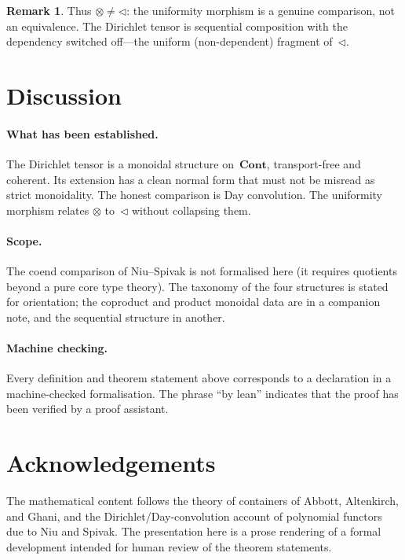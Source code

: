 \documentclass[11pt,a4paper]{article}
\theoremstyle{plain}
\theoremstyle{definition}
\newtheorem{remark}[theorem]{Remark}
\newcommand{\Cont}{\mathbf{Cont}}
\newcommand{\seq}{\mathbin{\triangleleft}}
\newcommand{\Dir}{\mathbin{\otimes}}
\begin{document}
\begin{remark}
Thus $\Dir \neq \seq$: the uniformity morphism is a genuine comparison,
not an equivalence. The Dirichlet tensor is sequential composition with
the dependency switched off---the uniform (non-dependent) fragment
of~$\seq$.
\end{remark}

\section{Discussion}

\paragraph{What has been established.}
The Dirichlet tensor is a monoidal structure on~$\Cont$, transport-free
and coherent. Its extension has a clean normal form that must not be
misread as strict monoidality. The honest comparison is Day convolution.
The uniformity morphism relates $\Dir$ to~$\seq$ without collapsing them.

\paragraph{Scope.}
The coend comparison of Niu--Spivak is not formalised here (it requires
quotients beyond a pure core type theory). The taxonomy of the four
structures is stated for orientation; the coproduct and product monoidal
data are in a companion note, and the sequential structure in another.

\paragraph{Machine checking.}
Every definition and theorem statement above corresponds to a declaration
in a machine-checked formalisation. The phrase ``by lean'' indicates that
the proof has been verified by a proof assistant.

\section*{Acknowledgements}

The mathematical content follows the theory of containers of Abbott,
Altenkirch, and Ghani, and the Dirichlet/Day-convolution account of
polynomial functors due to Niu and Spivak. The presentation here is a
prose rendering of a formal development intended for human review of the
theorem statements.
\end{document}
